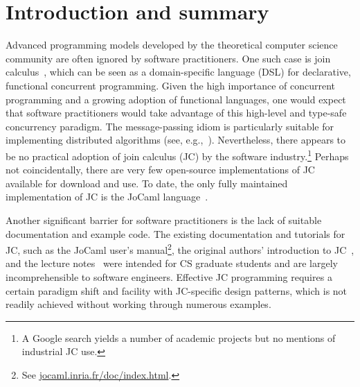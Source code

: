\documentclass[sigplan,10pt]{acmart}\settopmatter{}
\begin{document}


\maketitle


\section{Introduction and summary}

Advanced programming models developed by the theoretical computer
science community are often ignored by software practitioners. One
such case is join calculus~\citep{FouGon1996}, which can be
seen as a domain-specific language (DSL) for declarative, functional
concurrent programming. Given the high importance of concurrent programming
and a growing adoption of functional languages, one would expect that
software practitioners would take advantage of this high-level and
type-safe concurrency paradigm. The message-passing idiom is particularly
suitable for implementing distributed algorithms (see, e.g.,~\citep{BarEA2007}).
Nevertheless, there appears to be no practical adoption of join calculus (JC) by the
software industry.\footnote{ A Google search yields a number of academic projects but no mentions
of industrial JC use.} Perhaps not coincidentally, there are very few open-source implementations
of JC available for download and use. To date, the only fully maintained
implementation of JC is the JoCaml language~\citep{FouEA2003}.

Another significant barrier for software practitioners is the lack
of suitable documentation and example code. The existing documentation
and tutorials for JC, such as the JoCaml user's manual\footnote{ See \href{http://jocaml.inria.fr/doc/index.html}{jocaml.inria.fr/doc/index.html}.},
the original authors' introduction to JC~\citep{FouGon2000}, and
the lecture notes~\citep{FouEA2003} were intended for CS graduate students
and are largely incomprehensible to software engineers.
Effective JC programming requires a certain paradigm shift and facility
with JC-specific design patterns, which is not readily achieved without
working through numerous examples.
\end{document}
